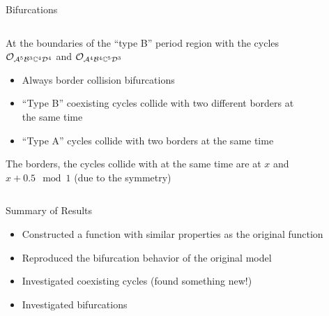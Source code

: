 \begin{frame}{Bifurcations}
    \begin{columns}
        \begin{column}{.5 \textwidth}
            At the boundaries of the ``type B'' period region with the cycles $\mathcal{O}_{\mathcal{A}^5\mathcal{B}^3\mathbb{C}^4\mathcal{D}^4}$ and $\mathcal{O}_{\mathcal{A}^4\mathcal{B}^4\mathbb{C}^5\mathcal{D}^3}$
            \vspace{1em}
            \begin{itemize}
                \item Always border collision bifurcations
                \item ``Type B'' coexisting cycles collide with two different borders at the same time
                \item ``Type A'' cycles collide with two borders at the same time
            \end{itemize}
            \vspace{1em}
            The borders, the cycles collide with at the same time are at $x$ and $x + 0.5 \mod 1$ (due to the symmetry)
        \end{column}
        \begin{column}{.5 \textwidth}
            \vspace{-2em}
            \begin{figure}
                \centering
                \quad
                \\
                \quad
            \end{figure}
        \end{column}
    \end{columns}
\end{frame}

\begin{frame}{Summary of Results}
    \begin{itemize}
        \item Constructed a function with similar properties as the original function
        \item Reproduced the bifurcation behavior of the original model
        \item Investigated coexisting cycles (found something new!)
        \item Investigated bifurcations
    \end{itemize}
\end{frame}
